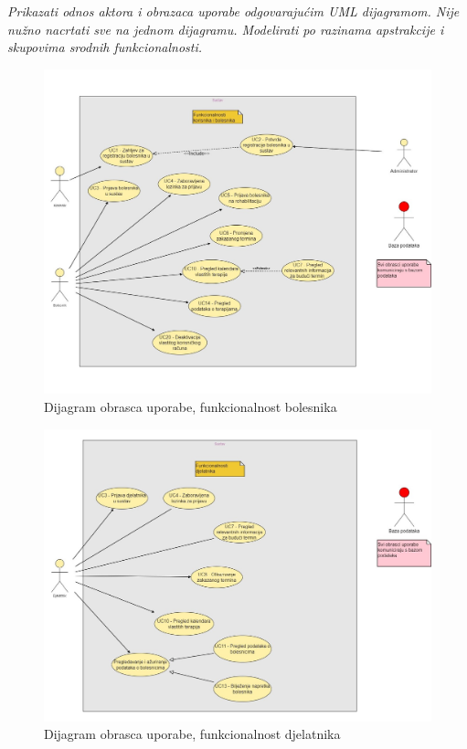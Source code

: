 \documentclass[12pt]{report}
\begin{document}
\textit{Prikazati odnos aktora i obrazaca uporabe odgovarajućim UML dijagramom. Nije nužno nacrtati sve na jednom dijagramu. Modelirati po razinama apstrakcije i skupovima srodnih funkcionalnosti.}
\begin{figure}[h]
    \centering
    \includegraphics[width=\textwidth]{./slike/UC Dijagram - Bolesnik} 
    \caption{Dijagram obrasca uporabe, funkcionalnost bolesnika}
    \label{fig:my_image}
\end{figure}
\begin{figure}[p]
    \centering
    \includegraphics[width=\textwidth]{./slike/UC Dijagram - Djelatnik} 
    \caption{Dijagram obrasca uporabe, funkcionalnost djelatnika}
    \label{fig:my_image}
\end{figure}
\end{document}
